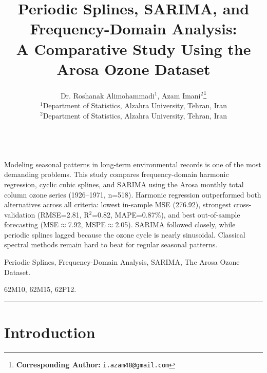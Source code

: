 \documentclass[10pt,twoside]{article}
\numberwithin{equation}{section}
\begin{document}
\thispagestyle{empty}
\title{Periodic Splines, SARIMA, and Frequency-Domain Analysis: \\

       A Comparative Study Using the Arosa Ozone Dataset}
\author{

  Dr. Roshanak Alimohammadi$^1$, Azam Imani$^{2}$\footnote[2]{{\bf Corresponding Author:} {\tt i.azam48@gmail.com}} \\

  $^1$Department of Statistics, Alzahra University, Tehran, Iran \\

  $^2$Department of Statistics, Alzahra University, Tehran, Iran

}
\thispagestyle{empty}

\maketitle



\\

Modeling seasonal patterns in long-term environmental records is one of the most demanding problems. This study compares frequency-domain harmonic regression, cyclic cubic splines, and SARIMA using the Arosa monthly total column ozone series (1926–1971, n=518). Harmonic regression outperformed both alternatives across all criteria: lowest in-sample MSE (276.92), strongest cross-validation (RMSE=2.81, R$^2$=0.82, MAPE=0.87\%), and best out-of-sample forecasting (MSE$\approx$7.92, MSPE$\approx$2.05). SARIMA followed closely, while periodic splines lagged because the ozone cycle is nearly sinusoidal. Classical spectral methods remain hard to beat for regular seasonal patterns.



 Periodic Splines, Frequency-Domain Analysis, SARIMA, The Arosa Ozone Dataset.



 62M10, 62M15, 62P12.



\rule{\textwidth}{0.2mm}



\section{Introduction}
\end{document}
